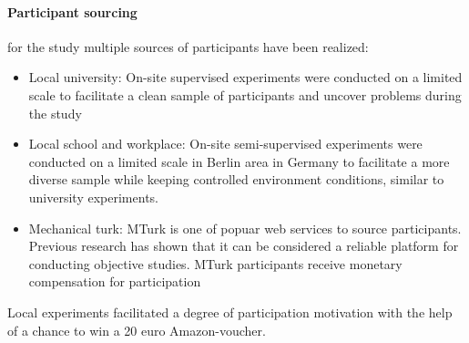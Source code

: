 \paragraph{Participant sourcing} for the study multiple sources of participants have been realized:
\begin{itemize}
	\item{Local university:} On-site supervised experiments were conducted on a limited scale to facilitate a clean sample of participants and uncover problems during the study
	\item{Local school and workplace:} On-site semi-supervised experiments were conducted on a limited scale in Berlin area in Germany to facilitate a more diverse sample while keeping controlled environment conditions, similar to university experiments.
	\item{Mechanical turk:} MTurk is one of popuar web services to source participants. Previous research has shown that it can be considered a reliable platform for conducting objective studies. MTurk participants receive monetary compensation for participation \cite{Buhrmester2011a}
	
\end{itemize}

Local experiments facilitated a degree of participation motivation with the help of a chance to win a 20 euro Amazon-voucher.